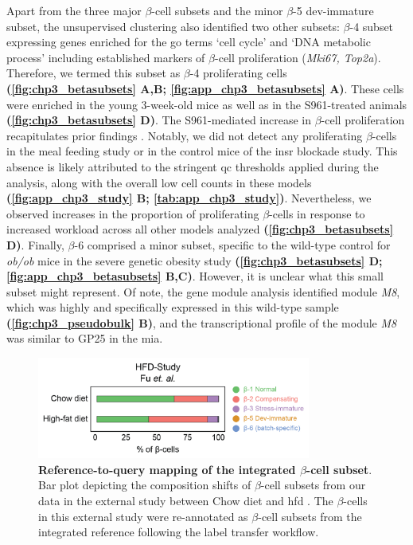 \par Apart from the three major $\beta$-cell subsets and the minor $\beta$-5 dev-immature subset, the unsupervised clustering also identified two other subsets: $\beta$-4 subset expressing genes enriched for the \gls{go} terms `cell cycle’ and `DNA metabolic process’ including established markers of $\beta$-cell proliferation (\textit{Mki67, Top2a}). Therefore, we termed this subset as $\beta$-4 proliferating cells \textbf{(\autoref{fig:chp3_betasubsets} A,B; \autoref{fig:app_chp3_betasubsets} A)}. These cells were enriched in the young 3-week-old mice as well as in the S961-treated animals \textbf{(\autoref{fig:chp3_betasubsets} D)}. The S961-mediated increase in $\beta$-cell proliferation recapitulates prior findings \textbf{\cite{shirakawa_signaling_2023,wortham_metabolic_2024}}. Notably, we did not detect any proliferating $\beta$-cells in the meal feeding study or in the control mice of the \gls{insr} blockade study. This absence is likely attributed to the stringent \gls{qc} thresholds applied during the analysis, along with the overall low cell counts in these models \textbf{(\autoref{fig:app_chp3_study} B; \autoref{tab:app_chp3_study})}. Nevertheless, we observed increases in the proportion of proliferating $\beta$-cells in response to increased workload across all other models analyzed \textbf{(\autoref{fig:chp3_betasubsets} D)}. Finally, $\beta$-6 comprised a minor subset, specific to the wild-type control for \textit{ob/ob} mice in the severe genetic obesity study \textbf{(\autoref{fig:chp3_betasubsets} D; \autoref{fig:app_chp3_betasubsets} B,C)}. However, it is unclear what this small subset might represent. Of note, the gene module analysis identified module \textit{M8}, which was highly and specifically expressed in this wild-type sample \textbf{(\autoref{fig:chp3_pseudobulk} B)}, and the transcriptional profile of the module \textit{M8} was similar to GP25 in the \gls{mia}.\\

\begin{figure}
\vspace{-15pt}
\includegraphics[width=9cm]{Chapter5/Fig/F3-1-v2-04.png}
\caption[Reference-to-query mapping of the integrated $\beta$-cell subset]{\textbf{Reference-to-query mapping of the integrated $\beta$-cell subset}. Bar plot depicting the composition shifts of $\beta$-cell subsets from our data in the external study between Chow diet and \gls{hfd} \textbf{\cite{fu_single-cell_2023}}. The $\beta$-cells in this external study were re-annotated as $\beta$-cell subsets from the integrated reference following the label transfer workflow.}
\vspace{-8pt}
\label{fig:chp3_hfdmapping}
\end{figure}


